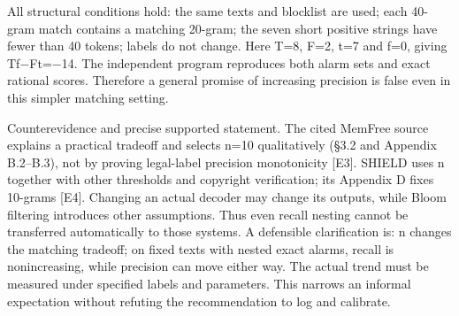\documentclass[10pt]{article}
\begin{document}
All structural conditions hold: the same texts and blocklist are used; each 40-gram match contains a matching 20-gram; the seven short positive strings have fewer than 40 tokens; labels do not change. Here T=8, F=2, t=7 and f=0, giving Tf\(-\)Ft=\(-\)14. The independent program reproduces both alarm sets and exact rational scores. Therefore a general promise of increasing precision is false even in this simpler matching setting.\par
Counterevidence and precise supported statement. The cited MemFree source explains a practical tradeoff and selects n=10 qualitatively (§3.2 and Appendix B.2–B.3), not by proving legal-label precision monotonicity [E3]. SHIELD uses n together with other thresholds and copyright verification; its Appendix D fixes 10-grams [E4]. Changing an actual decoder may change its outputs, while Bloom filtering introduces other assumptions. Thus even recall nesting cannot be transferred automatically to those systems. A defensible clarification is: n changes the matching tradeoff; on fixed texts with nested exact alarms, recall is nonincreasing, while precision can move either way. The actual trend must be measured under specified labels and parameters. This narrows an informal expectation without refuting the recommendation to log and calibrate.\par
\end{document}
